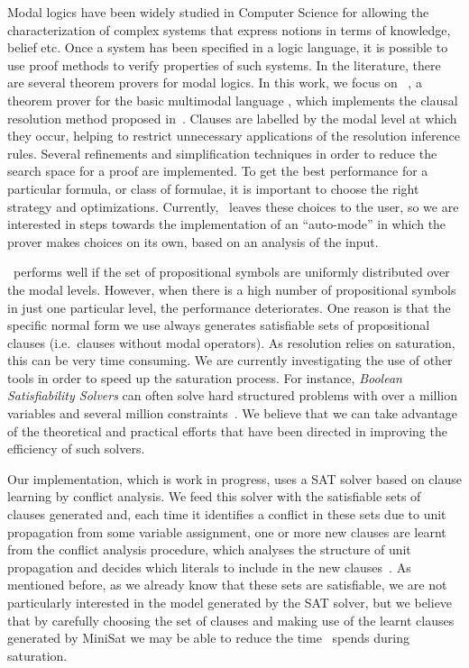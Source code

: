 Modal logics have been widely studied in Computer Science for allowing the
characterization of complex systems that express notions in terms of knowledge,
belief etc. Once a system has been specified in a logic language, it is possible
to use proof methods to verify properties of such systems. In the literature,
there are several theorem provers for modal logics.  In this work, we focus on
\ksp~\cite{Nalon2016}, a theorem prover for the basic multimodal language
, which implements the clausal resolution method proposed
in~\cite{nalon2015modal}.  Clauses are labelled by the modal level at which they
occur, helping to restrict unnecessary applications of the resolution inference
rules. Several refinements and simplification techniques in order to reduce the
search space for a proof are implemented. To get the best performance for a
particular formula, or class of formulae, it is important to choose the right
strategy and optimizations. Currently, \ksp~leaves these choices to the user, so
we are interested in steps towards the implementation of an ``auto-mode'' in
which the prover makes choices on its own, based on an analysis of the input.

\ksp~performs well if the set of propositional symbols are uniformly distributed
over the modal levels. However, when there is a high number of propositional
symbols in just one particular level, the performance deteriorates. One reason
is that the specific normal form we use always generates satisfiable sets of
propositional clauses (i.e.\ clauses without modal operators). As resolution
relies on saturation, this can be very time consuming. We are currently
investigating the use of other tools in order to speed up the saturation
process. For instance, \emph{Boolean Satisfiability Solvers} can often solve
hard structured problems with over a million variables and several million
constraints~\cite{satchapter}. We believe that we can take advantage of the
theoretical and practical efforts that have been directed in improving the
efficiency of such solvers. 

Our implementation, which is work in progress, uses a SAT solver based on clause
learning by conflict analysis. We feed this solver with the satisfiable sets of
clauses generated and, each time it identifies a conflict in these sets due to
unit propagation from some variable assignment, one or more new clauses are
learnt from the conflict analysis procedure, which analyses the structure of
unit propagation and decides which literals to include in the new
clauses~\cite{cdclchapter}. As mentioned before, as we already know that these
sets are satisfiable, we are not particularly interested in the model generated
by the SAT solver, but we believe that by carefully choosing the set of clauses
and making use of the learnt clauses generated by MiniSat we may be able to
reduce the time \ksp~spends during saturation. 

